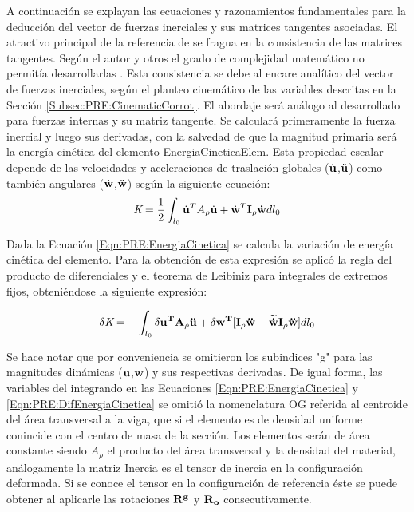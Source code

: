 A continuación se explayan las ecuaciones y razonamientos fundamentales para la deducción del vector de fuerzas inerciales y sus matrices tangentes asociadas. El atractivo principal de la referencia de \cite{Le2014} se fragua en la consistencia de las matrices tangentes. Según el autor y otros el grado de complejidad matemático no permitía desarrollarlas \citep{Crisfield}. Esta consistencia se debe al encare analítico del vector de fuerzas inerciales, según el planteo cinemático de las variables descritas en la Sección \ref{Subsec:PRE:CinematicCorrot}. El abordaje será análogo al desarrollado para fuerzas internas y su matriz tangente. Se calculará primeramente la fuerza inercial y luego sus derivadas, con la salvedad de que la magnitud primaria será la energía cinética del elemento \gls{EnergiaCineticaElem}. Esta propiedad escalar depende de las velocidades y aceleraciones de traslación globales ($\dot{\bf{u}}$,$\ddot{\bf{u}}$) como también angulares ($\dot{\bf{w}}$,$\ddot{\bf{w}}$) según la siguiente ecuación:
\begin{equation}
	\label{Eqn:PRE:EnergiaCinetica}
	\textit{K}=\frac{1}{2}\int_{l_0} \dot{\bf{u}}^T A_{\rho} \dot{\bf{u}} +
	\dot{\bf{w}}^T \bf{I_{\rho}}\dot{\bf{w}}\text{$dl_0$}
\end{equation}

 Dada la Ecuación \eqref{Eqn:PRE:EnergiaCinetica} se calcula la variación de energía cinética del elemento. Para la obtención de esta expresión se aplicó la regla del producto de diferenciales y el teorema de Leibiniz para integrales de extremos fijos, obteniéndose la siguiente expresión:

\begin{equation}
	\label{Eqn:PRE:DifEnergiaCinetica}
	\delta\textit{K}=-\int_{l_0} \delta \bf{u}^T A_{\rho} \ddot{\bf{u}} +\delta
	\bf{w}^T[\bf{I_{\rho}}\ddot{\bf{w}}+\widetilde{\dot{\bf{w}}}\bf{I_{\rho}}\ddot{\bf{w}}]
	\text{$dl_0$}
\end{equation}


Se hace notar que por conveniencia se omitieron los subindices "g" para las magnitudes dinámicas ($\bf{u}$,$\bf{w}$) y sus respectivas derivadas. De igual forma, las variables del integrando en las Ecuaciones  \eqref{Eqn:PRE:EnergiaCinetica} y \eqref{Eqn:PRE:DifEnergiaCinetica} se omitió la nomenclatura OG referida al centroide del área transversal a la viga, que si el elemento es de densidad uniforme conincide con el centro de masa de la sección. Los elementos serán de área constante siendo  $A_{\rho}$  el producto del área transversal y la densidad del material, análogamente la matriz \gls{Inercia} es el tensor de inercia en la configuración deformada. Si se conoce el tensor en la configuración de referencia éste se puede obtener al aplicarle las rotaciones $\bf{R}^g$ y $\bf{R}_o$ consecutivamente.

